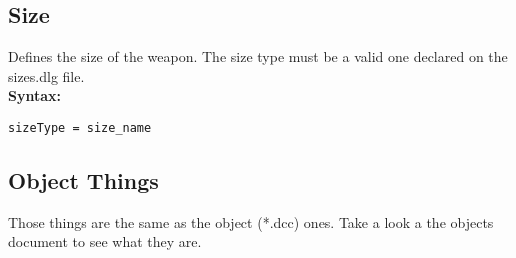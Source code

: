 \documentclass[letterpaper,12pt]{article}
\begin{document}
\subsection{Size}

Defines the size of the weapon. The size type must be a valid one
declared on the sizes.dlg file.\\

{\bf Syntax: }
\begin{verbatim}
sizeType = size_name
\end{verbatim}

\subsection{Object Things}
Those things are the same as the object (*.dcc) ones. Take a look a the objects document to see what they are.
\end{document}
